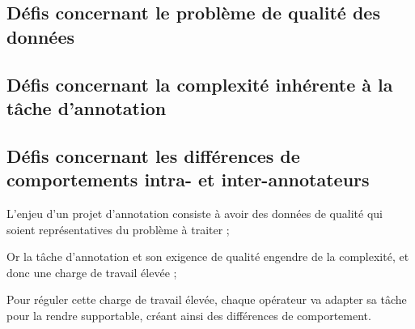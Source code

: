 		
		\subsection{Défis concernant le problème de qualité des données}
		\label{section:2.3.1-DEFIS-ANNOTATION-ASPECT-DONNEES}
		
		
		\subsection{Défis concernant la complexité inhérente à la tâche d'annotation}
		\label{section:2.3.2-DEFIS-ANNOTATION-ASPECT-COMPLEXITE}
		
		
		\subsection{Défis concernant les différences de comportements intra- et inter-annotateurs}
		\label{section:2.3.3-DEFIS-ANNOTATION-ASPECT-HUMAIN}
		
		
		\begin{leftBarSummary}
			\begin{todolist}
				\item[\itemok] L'enjeu d'un projet d'annotation consiste à avoir des données de qualité qui soient représentatives du problème à traiter ;
				\item[\itemok] Or la tâche d'annotation et son exigence de qualité engendre de la complexité, et donc une charge de travail élevée ;
				\item[\itemok] Pour réguler cette charge de travail élevée, chaque opérateur va adapter sa tâche pour la rendre supportable, créant ainsi des différences de comportement.
			\end{todolist}
		\end{leftBarSummary}
	
	
